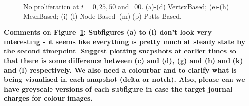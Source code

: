 \documentclass{article}
\newcommand{\highlight}[1]{{\color{red} \bf{#1}}}
\begin{document}
\begin{figure}
{\label{fig:DeltaNotchNonProlif:l}
}
\caption{No proliferation at $t=0,25,50$ and $100$. (a)-(d) VertexBased; (e)-(h) MeshBased; (i)-(l) Node Based; (m)-(p) Potts Based.}
\label{fig:DeltaNotchNonProlif}
\end{figure}

\highlight{Comments on Figure~\ref{fig:DeltaNotchNonProlif}: 
Subfigures (a) to (l) don't look very interesting - it seems like everything is pretty much at steady state by the second timepoint. 
Suggest plotting snapshots at earlier times so that there is some difference between (c) and (d), (g) and (h) and (k) and (l) respectively. 
We also need a colourbar and to clarify what is being visualised in each snapshot (delta or notch). 
Also, please can we have greyscale versions of each subfigure in case the target journal charges for colour images.
}
\end{document}
